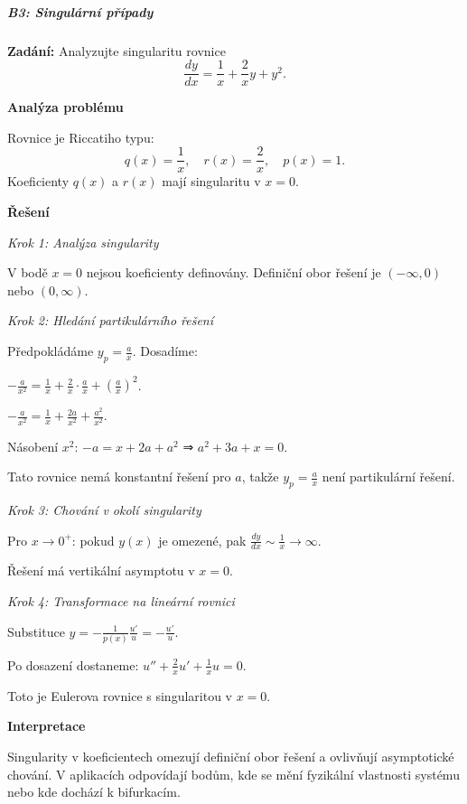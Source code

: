 \vspace{2\baselineskip}

\subparagraph*{B3: Singulární případy}
\label{subpar:b3-singularni-pripady}

\begin{example}
\label{ex:b3-lehky-singularita-koeficienty}

\noindent\textbf{Zadání:} Analyzujte singularitu rovnice
\[
\frac{dy}{dx} = \frac{1}{x} + \frac{2}{x}y + y^2.
\]

\vspace{1.5\baselineskip}

\noindent\textbf{Analýza problému}

\noindent Rovnice je Riccatiho typu:
\[
q(x) = \frac{1}{x}, \quad r(x) = \frac{2}{x}, \quad p(x) = 1.
\]
Koeficienty $q(x)$ a $r(x)$ mají singularitu v $x = 0$.

\vspace{1.5\baselineskip}

\noindent\textbf{Řešení}

\noindent\textit{Krok 1: Analýza singularity}

V bodě $x = 0$ nejsou koeficienty definovány. Definiční obor řešení je 
$(-\infty, 0)$ nebo $(0, \infty)$.

\noindent\textit{Krok 2: Hledání partikulárního řešení}

Předpokládáme $y_p = \frac{a}{x}$. Dosadíme:

$-\frac{a}{x^2} = \frac{1}{x} + \frac{2}{x}\cdot\frac{a}{x} + \left(\frac{a}{x}\right)^2$.

$-\frac{a}{x^2} = \frac{1}{x} + \frac{2a}{x^2} + \frac{a^2}{x^2}$.

Násobení $x^2$: $-a = x + 2a + a^2$ ⇒ $a^2 + 3a + x = 0$.

Tato rovnice nemá konstantní řešení pro $a$, takže $y_p = \frac{a}{x}$ není partikulární řešení.

\noindent\textit{Krok 3: Chování v okolí singularity}

Pro $x \to 0^+$: pokud $y(x)$ je omezené, pak $\frac{dy}{dx} \sim \frac{1}{x} \to \infty$.

Řešení má vertikální asymptotu v $x = 0$.

\noindent\textit{Krok 4: Transformace na lineární rovnici}

Substituce $y = -\frac{1}{p(x)}\frac{u'}{u} = -\frac{u'}{u}$.

Po dosazení dostaneme: $u'' + \frac{2}{x}u' + \frac{1}{x}u = 0$.

Toto je Eulerova rovnice s singularitou v $x = 0$.

\vspace{1.5\baselineskip}

\noindent\textbf{Interpretace}

Singularity v koeficientech omezují definiční obor řešení a ovlivňují 
asymptotické chování. V aplikacích odpovídají bodům, kde se mění fyzikální 
vlastnosti systému nebo kde dochází k bifurkacím.

\end{example}

